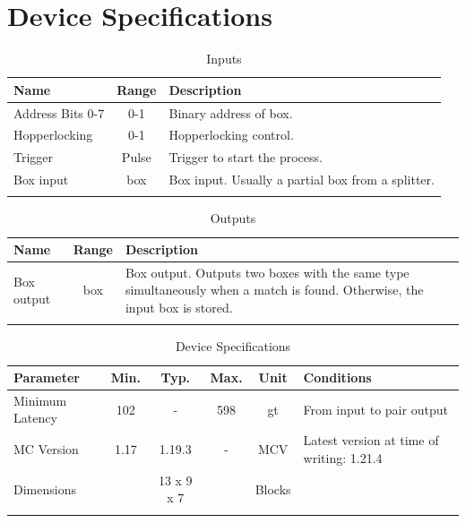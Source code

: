 \documentclass[10pt]{datasheet}
\begin{document}
\onecolumn

\section{Device Specifications}

\begin{table}[H]
    \caption{Inputs}
    \begin{tabularx}{\textwidth}{l | c | X}
        \thickhline
        \textbf{Name} & \textbf{Range} & \textbf{Description} \\
        \hline
        Address Bits 0-7 & 0-1 & Binary address of box. \\
        \hline
        Hopperlocking & 0-1 & Hopperlocking control. \\
        \hline
        Trigger & Pulse & Trigger to start the process. \\
        \hline
        Box input & box & Box input. Usually a partial box from a splitter. \\
        \thickhline
\end{tabularx}
\end{table}

\begin{table}[H]
    \caption{Outputs}
    \begin{tabularx}{\textwidth}{l | c | X}
        \thickhline
        \textbf{Name} & \textbf{Range} & \textbf{Description} \\
        \hline
        Box output & box & Box output. Outputs two boxes with the same type simultaneously when a match is found. Otherwise, the input box is stored. \\
        \thickhline
\end{tabularx}
\end{table}

\begin{table}[H]
    \caption{Device Specifications}
    \begin{tabularx}{\textwidth}{l | c c c | c | X}
        \thickhline
        \textbf{Parameter} & \textbf{Min.} & \textbf{Typ.} & \textbf{Max.} &
        \textbf{Unit} & \textbf{Conditions} \\
        \hline
        Minimum Latency & 102 & - & 598 & gt & From input to pair output \\
        \hline
        MC Version & 1.17 & 1.19.3 & - & MCV & Latest version at time of writing: 1.21.4\\
        \hline
        Dimensions & & 13 x 9 x 7 & & Blocks & \\
        \thickhline
\end{tabularx}
\end{table}
\end{document}
